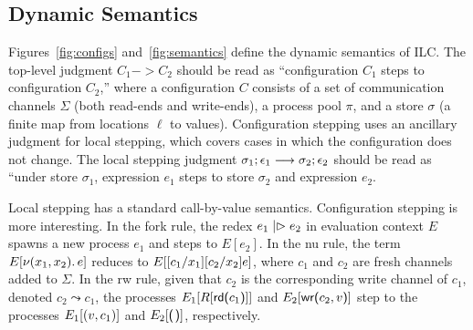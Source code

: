 \begin{comment}
The fork rule says that that if we can appropriately split the affine context
such that the child process $e_1$ has type $A$ and mode $m_1$ and the
``continue'' process $e_2$ has type $B$ and mode $m_2$, then the whole
expression has type $B$ and mode $m_3$, which is derived by composing $m_1$ and
$m_2$ in parallel. Again, we emphasize that composing two write mode processes
in parallel violates type checking, i.e., $\Wm ;; \Wm => p$ cannot be derived
for any mode $p$.

Finally, the choice rule says that if we can appropriately split the affine
context such that both subexpressions $A$ and mode $R$, then the whole
expression follows exactly.

\paragraph{Affine rules.} The affine typing rules are, for the most part, analagous to their
intuitionistic counterparts. Two differences bear mentioning. First, the bang!
rule only lifts intuitionistically typed expressions that are closed with
respect to affine variables into an affinely typed expression. Otherwise, one
could wrap an intuitionistically typed expression with free affine variables in
a bang! and use it in an unrestricted manner. Second, in contrast with the abs
rule, the lollipop rule does not require function bodies to be free with respect
to affine variables.
\end{comment}

\subsection{Dynamic Semantics}
\label{subsec:semantics}

 Figures~\ref{fig:configs} and~\ref{fig:semantics} define the dynamic semantics
of ILC. The top-level judgment $C_1 -> C_2$ should be read as ``configuration
$C_1$ steps to configuration $C_2$,'' where a configuration $C$ consists of a
set of communication channels $\Sigma$ (both read-ends and write-ends), a process
pool $\pi$, and a store $\sigma$ (a finite map from locations $\ell$ to
values). Configuration stepping uses an ancillary judgment for local stepping,
which covers cases in which the configuration does not change. The local
stepping judgment $\sigma_1; \epsilon_1 \longrightarrow \sigma_2; \epsilon_2$ should be read as ``under store
$\sigma_1$, expression $e_1$ steps to store $\sigma_{2}$ and expression $e_2$.

Local stepping has a standard call-by-value semantics. Configuration stepping is
more interesting. In the fork rule, the redex $e_1 \mathrel{|\rhd} e_2$ in evaluation
context $E$ spawns a new process $e_1$ and steps to $E[e_2]$. In the nu rule,
the term $E[ \nu(x_1, x_2).\,e ]$ reduces to $E[
[c_1/x_1][c_2/x_2]e ]$, where $c_1$ and $c_2$ are fresh channels
added to $\Sigma$. In the rw rule, given that $c_2$ is the corresponding write
channel of $c_1$, denoted $c_2 \leadsto c_1$, the processes $E_1[R[ \text{\textsf{rd}}\textsf{(}{c_1}\textsf{)}]
]$ and $E_2[ \text{\textsf{wr}}\textsf{(}{c_2},{v}\textsf{)}]$ step to the processes $E_1[
(v, c_1)]$ and $E_2[ \eUnit]$, respectively.

